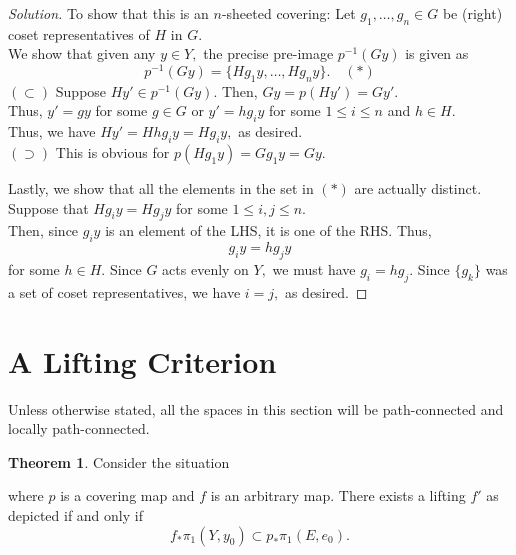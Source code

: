 \documentclass[12pt]{article}
\theoremstyle{definition}
\newtheorem{thm}{Theorem}
\numberwithin{thm}{section}
\newenvironment{soln}{\begin{proof}[Solution]}{\end{proof}}
\begin{document}
\begin{soln}
	To show that this is an $n$-sheeted covering: Let $g_1, \ldots, g_n \in G$ be (right) coset representatives of $H$ in $G.$\\
	We show that given any $y \in Y,$ the precise pre-image $p^{-1}(Gy)$ is given as
	\begin{equation*} 
		p^{-1}(Gy) = \{Hg_1y, \ldots, Hg_ny\}. \quad (*)
	\end{equation*}
	$(\subset)$ Suppose $Hy' \in p^{-1}(Gy).$ Then, $Gy = p(Hy') = Gy'.$\\
	Thus, $y' = gy$ for some $g \in G$ or $y' = hg_iy$ for some $1 \le i \le n$ and $h \in H.$\\
	Thus, we have $Hy' = Hhg_iy = Hg_iy,$ as desired.\\
	$(\supset)$ This is obvious for $p(Hg_1y) = Gg_1y = Gy.$

	Lastly, we show that all the elements in the set in $(*)$ are actually distinct. Suppose that $Hg_iy = Hg_jy$ for some $1 \le i, j \le n.$\\
	Then, since $g_iy$ is an element of the LHS, it is one of the RHS. Thus,
	\begin{equation*} 
		g_iy = hg_jy
	\end{equation*}
	for some $h \in H.$ Since $G$ acts evenly on $Y,$ we must have $g_i = hg_j.$ Since $\{g_k\}$ was a set of coset representatives, we have $i = j,$ as desired.
\end{soln}
%
\section{A Lifting Criterion}
Unless otherwise stated, all the spaces in this section will be path-connected and locally path-connected.

\begin{thm} \label{thm:liftcriterion}
	Consider the situation	
	\begin{center}
	\end{center}
	where $p$ is a covering map and $f$ is an arbitrary map. There exists a lifting $f'$ as depicted if and only if 
	\begin{equation*} 
		f_*\pi_1(Y, y_0) \subset p_*\pi_1(E, e_0).
	\end{equation*}
\end{thm}
\end{document}
